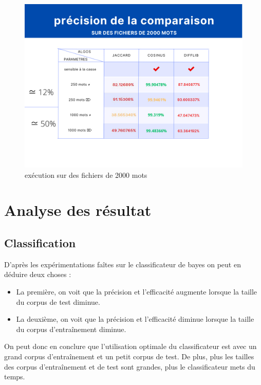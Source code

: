 \documentclass[french,12pt]{article}
\begin{document}
\begin{center}
\begin{figure}[ht!]
\includegraphics[scale=0.4]{img/true_comparaison_2000_mots.png}
\caption{exécution sur des fichiers de 2000 mots}
\end{figure}


\end{center}
\newpage
\section{Analyse des résultat}
\subsection{Classification}
D'après les expérimentations faîtes sur le classificateur de bayes on peut en déduire deux choses :\\

\begin{itemize}
	\item La première, on voit que la précision et l'efficacité augmente lorsque la taille du corpus de test diminue.
	\item La deuxième, on voit que la précision et l'efficacité diminue lorsque la taille du corpus d'entraînement diminue.\\
\end{itemize}

On peut donc en conclure que l'utilisation optimale du classificateur est avec un grand corpus d'entraînement et un petit corpus de test. De plus, plus les tailles des corpus d'entraînement et de test sont grandes, plus le classificateur mets du temps.\\
\end{document}
